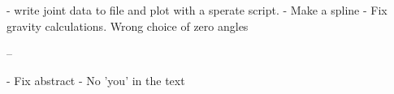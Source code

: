 - write joint data to file and plot with a sperate script. 
- Make a spline 
- Fix gravity calculations. Wrong choice of zero angles

--

- Fix abstract
- No 'you' in the text